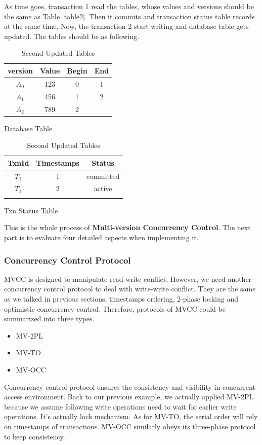 As time goes, transaction 1 read the tables, whose values and versions should be the same as Table \ref{table2}. Then it commits and transaction status table records at the same time. Now, the transaction 2 start writing and database table gets updated. The tables should be as following.
\begin{table}[H]
	\parbox{.45\linewidth}{
		\centering
		\begin{tabular}{|c|c|c|c|}
			\hline
			version&Value&Begin&End\\\hline
			$A_0$&123&0&1 \\\hline
			$A_1$&456&1&2 \\\hline
			$A_2$&789&2& \\\hline
		\end{tabular}
		\caption*{Database Table}
	}
	\hfill
	\parbox{.45\linewidth}{
		\begin{tabular}{|c|c|c|}
			\hline
			TxnId&Timestamps&Status\\\hline
			$T_1$&1&committed \\\hline
			$T_1$&2&active \\\hline
			&&\\\hline
		\end{tabular}
		\caption*{Txn Status Table}
	}
	\caption{Second Updated Tables\label{table3}}
\end{table}
This is the whole process of \textbf{Multi-version Concurrency Control}. The next part is to evaluate four detailed aspects when implementing it. 

\subsubsection{Concurrency Control Protocol}
MVCC is designed to manipulate read-write conflict. However, we need another concurrency control protocol to deal with write-write conflict. They are the same as we talked in previous sections, timestamps ordering, 2-phase locking and optimistic concurrency control. Therefore, protocols of MVCC could be summarized into three types.
\begin{itemize}
	\item MV-2PL
	\item MV-TO
	\item MV-OCC
\end{itemize} 
Concurrency control protocol ensures the consistency and visibility in concurrent access environment. Back to our previous example, we actually applied MV-2PL because we assume following write operations need to wait for earlier write operations. It's actually lock mechanism. As for MV-TO, the serial order will rely on timestamps of transactions. MV-OCC similarly obeys its three-phase protocol to keep consistency.\\
 
